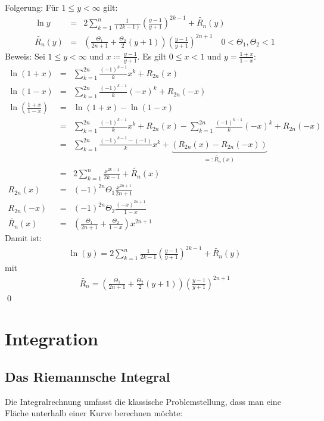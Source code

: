 \documentclass[ngerman,titlepage,twoside, parskip=half*]{scrreprt}
\theoremstyle{break}
\theoremstyle{nonumberbreak}
\begin{document}
Folgerung: Für $1\leq y<\infty$ gilt:
\begin{align*}
  \ln y &=& 2\sum_{k=1}^n \frac{1}{(2k-1)}\left( \frac{y-1}{y+1} \right)^{2k-1}
  +\widetilde{R_n}(y)\\
  \widetilde{R_n}(y) &=& \left( \frac{\Theta_1}{2n+1}+\frac{\Theta_2}{2}(y+1) \right)
  \left( \frac{y-1}{y+1} \right)^{2n+1}\quad 0<\Theta_1,\Theta_2<1
\end{align*}
Beweis: Sei $1\leq y <\infty$ und $x\coloneqq\frac{y-1}{y+1}$. Es gilt $0\leq x<1$
und $y=\frac{1+x}{1-x}$:
\begin{align*}
  \ln(1+x) &=& \sum_{k=1}^{2n}\frac{(-1)^{k-1}}{k}x^k+R_{2n}(x)\\
  \ln(1-x) &=& \sum_{k=1}^{2n}\frac{(-1)^{k-1}}{k}(-x)^k+R_{2n}(-x)\\
  \ln\left( \frac{1+x}{1-x} \right) &=& \ln(1+x)-\ln(1-x)\\
  &=& \sum_{k=1}^{2n}\frac{(-1)^{k-1}}{k}x^k+R_{2n}(x)-
  \sum_{k=1}^{2n}\frac{(-1)^{k-1}}{k}(-x)^k+R_{2n}(-x)\\
  &=& \sum_{k=1}^{2n}\frac{(-1)^{k-1}-(-1)}{k}x^k+
  \underbrace{(R_{2n}(x)-R_{2n}(-x))}_{=:\widetilde{R_n}(x)}\\
  &=& 2\sum_{k=1}^n\frac{x^{2k-1}}{2k-1}+\widetilde{R_n}(x)\\
  R_{2n}(x)&=& (-1)^{2n}\Theta_1\frac{x^{2n+1}}{2n+1}\\
  R_{2n}(-x)&=& (-1)^{2n}\Theta_2\frac{(-x)^{2n+1}}{1-x}\\
  \widetilde{R_n}(x)&=& \left( \frac{\Theta_1}{2n+1}+\frac{\Theta_2}{1-x} \right)
  x^{2n+1}
\end{align*}
Damit ist:
\begin{gather*}\boxed{\ln(y)=2\sum_{k=1}^n\frac{1}{2k-1}\left( \frac{y-1}{y+1} \right)^{2k-1}
+\widetilde{R_n}(y)}\end{gather*}
mit
\begin{gather*}\boxed{\widetilde{R_n}=\left( \frac{\Theta_1}{2n+1}+\frac{\Theta_2}{2}
(y+1)\right)\left( \frac{y-1}{y+1} \right)^{2n+1}}\end{gather*}
\qed

\chapter{Integration}
\section{Das Riemannsche Integral}
Die Integralrechnung umfasst die klassische Problemstellung, 
dass man eine Fläche unterhalb einer Kurve berechnen möchte:
\end{document}
